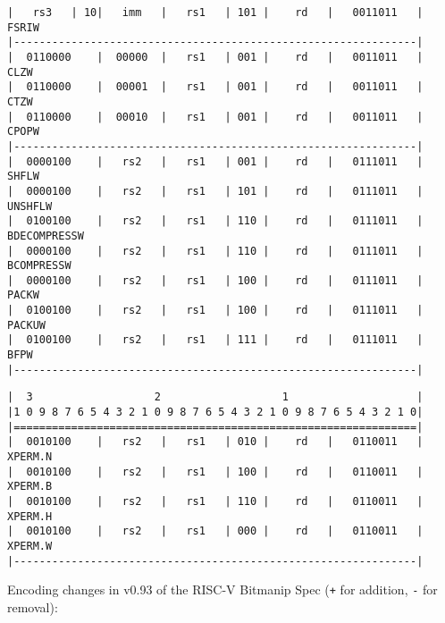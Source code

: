 \begin{minipage}{\linewidth}
\begin{verbatim}
|   rs3   | 10|   imm   |   rs1   | 101 |    rd   |   0011011   |  FSRIW
|---------------------------------------------------------------|
|  0110000    |  00000  |   rs1   | 001 |    rd   |   0011011   |  CLZW
|  0110000    |  00001  |   rs1   | 001 |    rd   |   0011011   |  CTZW
|  0110000    |  00010  |   rs1   | 001 |    rd   |   0011011   |  CPOPW
|---------------------------------------------------------------|
|  0000100    |   rs2   |   rs1   | 001 |    rd   |   0111011   |  SHFLW
|  0000100    |   rs2   |   rs1   | 101 |    rd   |   0111011   |  UNSHFLW
|  0100100    |   rs2   |   rs1   | 110 |    rd   |   0111011   |  BDECOMPRESSW
|  0000100    |   rs2   |   rs1   | 110 |    rd   |   0111011   |  BCOMPRESSW
|  0000100    |   rs2   |   rs1   | 100 |    rd   |   0111011   |  PACKW
|  0100100    |   rs2   |   rs1   | 100 |    rd   |   0111011   |  PACKUW
|  0100100    |   rs2   |   rs1   | 111 |    rd   |   0111011   |  BFPW
|---------------------------------------------------------------|
\end{verbatim}
\end{minipage}

\begin{minipage}{\linewidth}
\begin{verbatim}
|  3                   2                   1                    |
|1 0 9 8 7 6 5 4 3 2 1 0 9 8 7 6 5 4 3 2 1 0 9 8 7 6 5 4 3 2 1 0|
|===============================================================|
|  0010100    |   rs2   |   rs1   | 010 |    rd   |   0110011   |  XPERM.N
|  0010100    |   rs2   |   rs1   | 100 |    rd   |   0110011   |  XPERM.B
|  0010100    |   rs2   |   rs1   | 110 |    rd   |   0110011   |  XPERM.H
|  0010100    |   rs2   |   rs1   | 000 |    rd   |   0110011   |  XPERM.W
|---------------------------------------------------------------|
\end{verbatim}
\end{minipage}


Encoding changes in v0.93 of the RISC-V Bitmanip Spec ({\tt +} for addition,
{\tt -} for removal):

